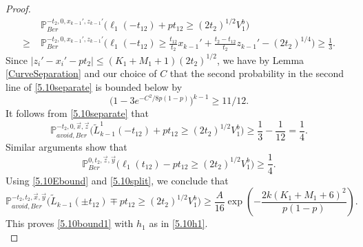 \begin{proof}
\begin{equation}
\begin{split}
	&\mathbb{P}^{-t_2,0,x_{k-1}',z_{k-1}'}_{Ber}\Big(\ell_1(-t_{12}) + pt_{12} \geq (2t_2)^{1/2}V_1^b\Big)\\
	\geq \; & \mathbb{P}^{-t_2,0,x_{k-1}',z_{k-1}'}_{Ber}\Big(\ell_1(-t_{12}) \geq \frac{t_{12}}{t_2}x_{k-1}' + \frac{t_2-t_{12}}{t_2}z_{k-1}' - (2t_2)^{1/4}\Big) \geq \frac{1}{3}.
	\end{split}
	\end{equation}
	Since $|z_i'-x_i'-pt_2| \leq (K_1+M_1+1)(2t_2)^{1/2}$, we have by Lemma \ref{CurveSeparation} and our choice of $C$ that the second probability in the second line of \eqref{5.10separate} is bounded below by
	\[
	\big(1-3e^{-C^2/8p(1-p)}\big)^{k-1} \geq 11/12.
	\]
	It follows from \eqref{5.10separate} that
	\begin{equation}\label{5.10left}
	\mathbb{P}^{-t_2,0,\vec{x},\vec{z}}_{avoid,Ber}\Big(\tilde{L}^1_{k-1}(-t_{12}) + pt_{12} \geq (2t_2)^{1/2}V_1^b\Big) \geq \frac{1}{3} - \frac{1}{12} = \frac{1}{4}.
	\end{equation}
	Similar arguments show that
	\begin{equation}\label{5.10right}
	\mathbb{P}^{0,t_2,\vec{z},\vec{y}}_{Ber}\Big(\ell_1(t_{12}) - pt_{12} \geq (2t_2)^{1/2}V_1^b\Big) \geq \frac{1}{4}.
	\end{equation}
	Using \eqref{5.10Ebound} and \eqref{5.10split}, we conclude that
	\[
	\mathbb{P}^{-t_2,t_2,\vec{x},\vec{y}}_{avoid, Ber}\Big(\tilde{L}_{k-1}(\pm t_{12}) \mp pt_{12} \geq (2t_2)^{1/2}V_1^b\Big) \geq \frac{A}{16}\exp\left(-\frac{2k(K_1+M_1+6)^2}{p(1-p)}\right).
	\]
	This proves \eqref{5.10bound1} with $h_1$ as in \eqref{5.10h1}.\\
	

\end{proof}
